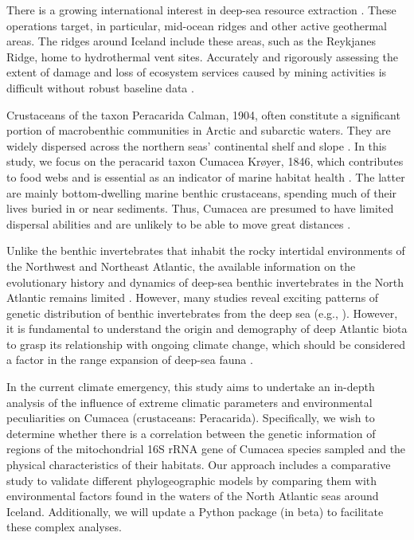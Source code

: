 There is a growing international interest in deep-sea resource extraction \citep{mengerink_call_2014}. These operations target, in particular, mid-ocean ridges and other active geothermal areas. The ridges around Iceland include these areas, such as the Reykjanes Ridge, home to hydrothermal vent sites. Accurately and rigorously assessing the extent of damage and loss of ecosystem services caused by mining activities is difficult without robust baseline data \citep{meisner_prefacebiodiversity_2018}.

Crustaceans of the taxon Peracarida Calman, 1904, often constitute a significant portion of macrobenthic communities in Arctic and subarctic waters. They are widely dispersed across the northern seas’ continental shelf and slope \citep{stransky_diversity_2010}. In this study, we focus on the peracarid taxon Cumacea Krøyer, 1846, which contributes to food webs and is essential as an indicator of marine habitat health \citep{stransky_diversity_2010}. The latter are mainly bottom-dwelling marine benthic crustaceans, spending much of their lives buried in or near sediments. Thus, Cumacea are presumed to have limited dispersal abilities and are unlikely to be able to move great distances \citep{uhlir_adding_2021}.

Unlike the benthic invertebrates that inhabit the rocky intertidal environments of the Northwest and Northeast Atlantic, the available information on the evolutionary history and dynamics of deep-sea benthic invertebrates in the North Atlantic remains limited \citep{jennings_phylogeographic_2014}. However, many studies reveal exciting patterns of genetic distribution of benthic invertebrates from the deep sea (e.g., \citep{wilson_historical_1998,havermans_genetic_2013}). However, it is fundamental to understand the origin and demography of deep Atlantic biota to grasp its relationship with ongoing climate change, which should be considered a factor in the range expansion of deep-sea fauna \citep{jennings_phylogeographic_2014}.

In the current climate emergency, this study aims to undertake an in-depth analysis of the influence of extreme climatic parameters and environmental peculiarities on Cumacea (crustaceans: Peracarida). Specifically, we wish to determine whether there is a correlation between the genetic information of regions of the mitochondrial 16S rRNA gene of Cumacea species sampled and the physical characteristics of their habitats. Our approach includes a comparative study to validate different phylogeographic models by comparing them with environmental factors found in the waters of the North Atlantic seas around Iceland. Additionally, we will update a Python package (in beta) to facilitate these complex analyses.

